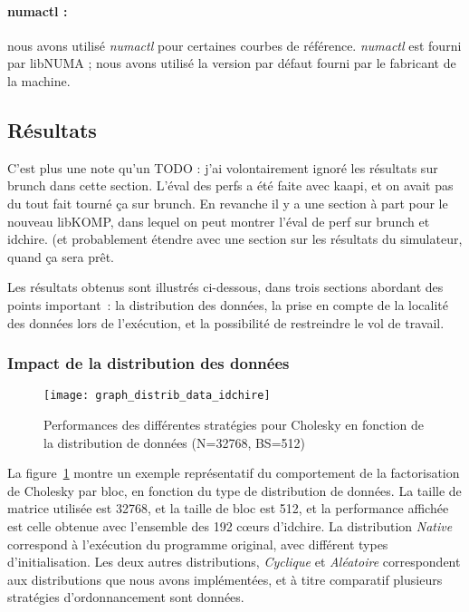 \paragraph{numactl :} nous avons utilisé \emph{numactl} pour certaines courbes de référence. \emph{numactl} est fourni par libNUMA ; nous avons utilisé la version par défaut fourni par le fabricant de la machine.


\subsection{Résultats}\label{sec:contribs:perf_eval:resultats}

\begin{todo}
  C'est plus une note qu'un TODO : j'ai volontairement ignoré les résultats sur brunch dans cette section.
  L'éval des perfs a été faite avec kaapi, et on avait pas du tout fait tourné ça sur brunch.
  En revanche il y a une section à part pour le nouveau libKOMP, dans lequel on peut montrer l'éval de perf sur brunch et idchire. (et probablement étendre avec une section sur les résultats du simulateur, quand ça sera prêt.
\end{todo}

Les résultats obtenus sont illustrés ci-dessous, dans trois sections abordant des points important~: la distribution des données, la prise en compte de la localité des données lors de l'exécution, et la possibilité de restreindre le vol de travail.

\subsubsection{Impact de la distribution des données}

\begin{figure}[ht]
  \centering
  \texttt{[image: graph\_distrib\_data\_idchire]}
  \caption{Performances des différentes stratégies pour Cholesky en fonction de la distribution de données (N=32768, BS=512)}\label{fig:contribs:perf_eval:distrib-idchire}
\end{figure}

La figure~\ref{fig:contribs:perf_eval:distrib-idchire} montre un exemple représentatif du comportement de la factorisation de Cholesky par bloc, en fonction du type de distribution de données. La taille de matrice utilisée est 32768, et la taille de bloc est 512, et la performance affichée est celle obtenue avec l'ensemble des 192 cœurs d'idchire.
La distribution \emph{Native} correspond à l'exécution du programme original, avec différent types d'initialisation.
Les deux autres distributions, \emph{Cyclique} et \emph{Aléatoire} correspondent aux distributions que nous avons implémentées, et à titre comparatif plusieurs stratégies d'ordonnancement sont données.


